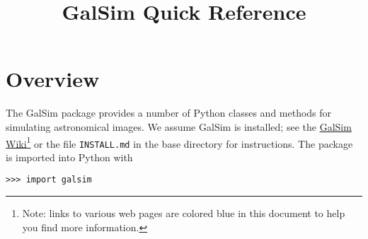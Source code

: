 \documentclass[preprint,10pt]{../../devel/modules/aastex}
\begin{document}
\setlength{\parskip}{2.0ex plus 0.5ex minus 0.5ex}
\setlength{\parindent}{0cm}

\title{GalSim Quick Reference}

\tableofcontents

\newpage

\section{Overview}


The GalSim package provides a number of Python classes and methods for
simulating astronomical images.  We assume GalSim is installed; see the
\href{https://github.com/GalSim-developers/GalSim/wiki}{GalSim
    Wiki}\footnote{Note: links to various web pages are colored blue in this document to help you find more information.} or the file \texttt{INSTALL.md} in the base directory
for instructions.  The package is imported into Python with

\texttt{>>> import galsim}
\end{document}

